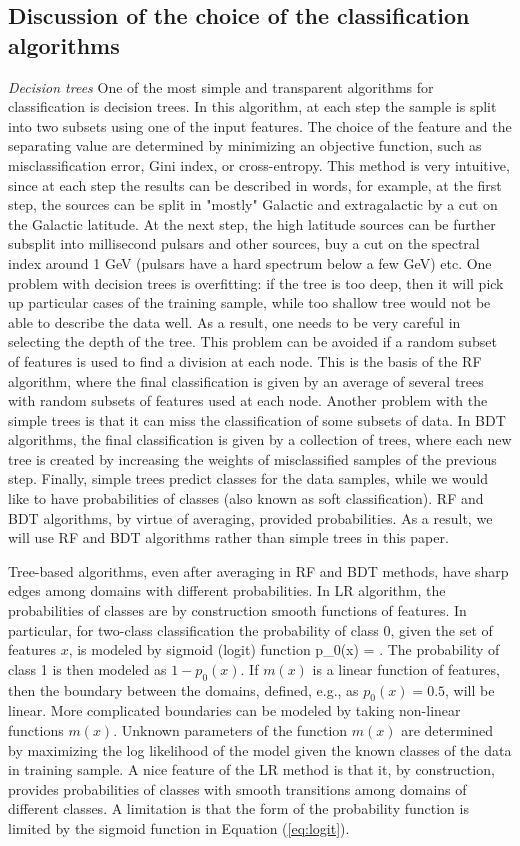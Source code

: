 \subsection{Discussion of the choice of the classification algorithms}
{\it Decision trees}
One of the most simple and transparent algorithms for classification is decision trees.
In this algorithm, at each step the sample is split into two subsets using one of the input features.
The choice of the feature and the separating value are determined by minimizing an objective function, such as misclassification
error, Gini index, or cross-entropy.
This method is very intuitive, since at each step the results can be described in words, 
for example, at the first step, the sources can be split in "mostly" Galactic and extragalactic by a cut on the Galactic latitude.
At the next step, the high latitude sources can be further subsplit into millisecond pulsars and other sources, buy a cut on the spectral index around 1 GeV (pulsars have a hard spectrum below a few GeV) etc.
One problem with decision trees is overfitting: if the tree is too deep, then it will pick up particular cases of the training sample, while too shallow tree would not be able to describe the data well. As a result, one needs to be very careful in selecting the depth of the tree.
This problem can be avoided if a random subset of features is used to find a division at each node. This is the basis of the RF algorithm,
where the final classification is given by an average of several trees with random subsets of features used at each node.
Another problem with the simple trees is that it can miss the classification of some subsets of data. In BDT algorithms, the final classification is given by a collection of trees, where each new tree is created by increasing the weights of misclassified samples of the previous step. 
Finally, simple trees predict classes for the data samples, while we would like to have probabilities of classes (also known as soft classification).
RF and BDT algorithms, by virtue of averaging, provided probabilities. As a result, we will use RF and BDT algorithms rather than simple trees in this paper.

Tree-based algorithms, even after averaging in RF and BDT methods, have sharp edges among domains with different probabilities.
In LR algorithm, the probabilities of classes are by construction smooth functions of features.
In particular, for two-class classification the probability of class 0, given the set of features $x$, is modeled by sigmoid (logit) function
\be
{}
p_0(x) = .
\ee
The probability of class 1 is then modeled as $1 - p_0(x)$.
If $m(x)$ is a linear function of features, then the boundary between the domains, defined, e.g., as $p_0(x) = 0.5$, will be linear.
More complicated boundaries can be modeled by taking non-linear functions $m(x)$.
Unknown parameters of the function $m(x)$ are determined by maximizing the log likelihood of the model given the known classes of the data in training sample.
A nice feature of the LR method is that it, by construction, provides probabilities of classes with smooth transitions among domains of different classes.
A limitation is that the form of the probability function is limited by the sigmoid function in Equation (\ref{eq:logit}).

